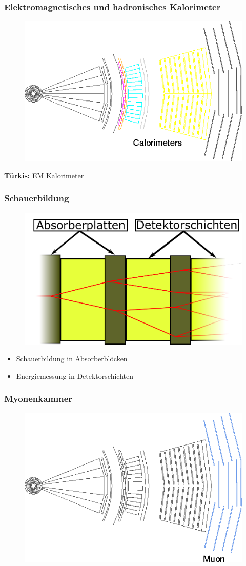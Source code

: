 \begin{frame}
	\frametitle{Elektromagnetisches und hadronisches Kalorimeter}
	\begin{center}
		\begin{figure}
			\includegraphics[width=0.75\linewidth]{graphics/slice_calorimeter_tr}
		\end{figure}
	\end{center}
	\textbf{Türkis: } EM Kalorimeter
\end{frame}
\begin{frame}
	\frametitle{Schauerbildung}
	\begin{figure}
		\centering
		\includegraphics[width=0.7\linewidth]{graphics/Kalorimeter}
	\end{figure}
	\begin{itemize}
		\item Schauerbildung in Absorberblöcken
		\item Energiemessung in Detektorschichten
	\end{itemize}
\end{frame}
\begin{frame}
	\frametitle{Myonenkammer}
	\begin{center}
		\begin{figure}
			\includegraphics[width=0.75\linewidth]{graphics/slice_muon_tr}
		\end{figure}
	\end{center}
\end{frame}


